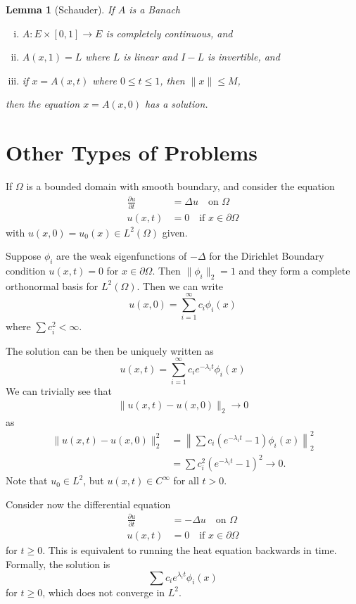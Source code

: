\documentclass[10pt, oneside, reqno]{amsart}
\theoremstyle{plain}%
\newtheorem{lem}[thm]{Lemma}
\numberwithin{equation}{section}
\theoremstyle{definition}
\theoremstyle{remark}
\begin{document}
\begin{lem}[Schauder]
	If $A$ is a Banach \begin{enumerate}[(i)]
		\item $A: E \times [0, 1] \rightarrow E$ is completely continuous, and 
		\item $A(x, 1) = L$ where $L$ is linear and $I - L$ is invertible, and 
		\item if $x = A(x, t)$ where $0 \leq t \leq 1$, then $\| x \| \leq M$,
	\end{enumerate}
	then the equation $x = A(x, 0)$ has a solution.
\end{lem} 

\section{Other Types of Problems} %
\label{sec:other_types_of_problems}
If $\Omega$ is a bounded domain with smooth boundary, and consider the equation \begin{align*}
	\frac{\partial u}{\partial t} &= \Delta u \quad \text{on $\Omega$} \\
	u(x, t) &= 0 \quad \text{if $x \in \partial \Omega$}
\end{align*} with $u(x, 0) = u_0(x) \in L^2(\Omega)$ given.  

Suppose $\phi_i$ are the weak eigenfunctions of $-\Delta$ for the Dirichlet Boundary condition $u(x, t) = 0$ for $x \in \partial \Omega$.  Then $\| \phi_i \|_2 = 1$ and they form a complete orthonormal basis for $L^2(\Omega)$.  Then we can write \[
	u(x, 0) = \sum_{i=1}^\infty c_i \phi_i(x)
\] where $\sum c_i^2 < \infty$.   

The solution can be then be uniquely written as \[
	u(x, t) = \sum_{i=1}^\infty c_i e^{-\lambda_i t} \phi_i(x)
\]  We can trivially see that \begin{align*}
	\| u(x, t) - u(x, 0) \|_2 \rightarrow 0 
\end{align*} as \begin{align*}
	\| u(x, t) - u(x, 0) \|_2^2 &= \left\| \sum c_i \left( e^{-\lambda_i t} - 1 \right) \phi_i(x)  \right\|_2^2 \\
	&= \sum c_i^2 \left( e^{-\lambda_i t} - 1 \right)^2 \rightarrow 0.
\end{align*}  Note that $u_0 \in L^2$, but $u(x, t) \in C^\infty$ for all $t > 0$.

Consider now the differential equation \begin{align*}
	\frac{\partial u}{\partial t} &= -\Delta u \quad \text{on $\Omega$} \\
	u(x, t) &= 0 \quad \text{if $x \in \partial \Omega$}
\end{align*} for $t \geq 0$.  This is equivalent to running the heat equation backwards in time.  Formally, the solution is \[
	\sum c_i e^{\lambda_i t} \phi_i(x) 
\] for $t \geq 0$, which does not converge in $L^2$.  
\end{document}
